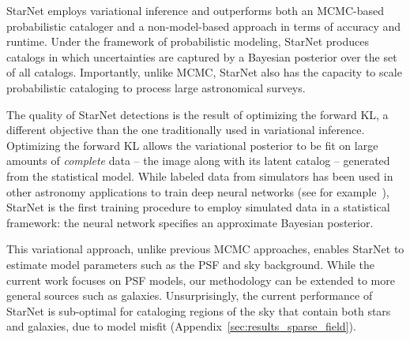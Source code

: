 StarNet employs variational inference and outperforms both an MCMC-based probabilistic cataloger and a non-model-based approach in terms of accuracy and runtime. 
Under the framework of probabilistic modeling, 
StarNet produces catalogs in which uncertainties are captured by a Bayesian posterior over the set of all catalogs.
Importantly, unlike MCMC, StarNet also has the capacity to scale probabilistic cataloging to process large astronomical surveys. 

The quality of StarNet detections is the result of optimizing the forward KL, a different objective than the one traditionally used in variational inference. 
Optimizing the forward KL allows the variational posterior to be fit on large amounts of {\itshape complete} data -- the image along with its latent catalog -- generated from the statistical model. 
While labeled data from simulators has been used in other astronomy applications to train deep neural networks (see for example~\cite{Lanusse_2017_cmudeeplens, huang2019finding}), StarNet is the first training procedure to employ simulated data in a statistical framework: the neural network specifies an approximate Bayesian posterior. 


This variational approach, unlike previous MCMC approaches, enables StarNet to estimate model parameters such as the PSF and sky background.
While the current work focuses on PSF models, our methodology can be extended to more general sources such as galaxies. 
Unsurprisingly, the current performance of StarNet is sub-optimal for cataloging regions of the sky that contain both stars and galaxies, due to model misfit (Appendix~\ref{sec:results_sparse_field}).  

